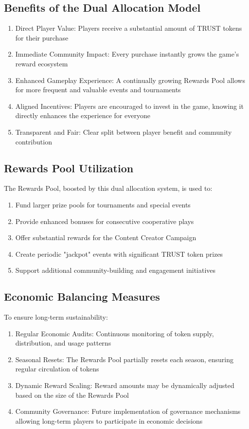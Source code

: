 \documentclass[12pt,a4paper]{article}
\begin{document}
\subsection{Benefits of the Dual Allocation Model}
\begin{enumerate}
    \item Direct Player Value: Players receive a substantial amount of TRUST tokens for their purchase
    \item Immediate Community Impact: Every purchase instantly grows the game's reward ecosystem
    \item Enhanced Gameplay Experience: A continually growing Rewards Pool allows for more frequent and valuable events and tournaments
    \item Aligned Incentives: Players are encouraged to invest in the game, knowing it directly enhances the experience for everyone
    \item Transparent and Fair: Clear split between player benefit and community contribution
\end{enumerate}

\subsection{Rewards Pool Utilization}
The Rewards Pool, boosted by this dual allocation system, is used to:
\begin{enumerate}
    \item Fund larger prize pools for tournaments and special events
    \item Provide enhanced bonuses for consecutive cooperative plays
    \item Offer substantial rewards for the Content Creator Campaign
    \item Create periodic "jackpot" events with significant TRUST token prizes
    \item Support additional community-building and engagement initiatives
\end{enumerate}

\subsection{Economic Balancing Measures}
To ensure long-term sustainability:
\begin{enumerate}
    \item Regular Economic Audits: Continuous monitoring of token supply, distribution, and usage patterns
    \item Seasonal Resets: The Rewards Pool partially resets each season, ensuring regular circulation of tokens
    \item Dynamic Reward Scaling: Reward amounts may be dynamically adjusted based on the size of the Rewards Pool
    \item Community Governance: Future implementation of governance mechanisms allowing long-term players to participate in economic decisions
\end{enumerate}
\end{document}
